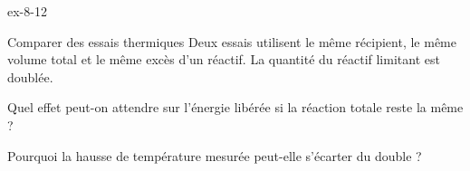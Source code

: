 \begin{blocLivre}{ex-8-12}\begin{exercice}[3]{Comparer des essais thermiques}
Deux essais utilisent le même récipient, le même volume total et le même excès d’un réactif. La quantité du réactif limitant est doublée.
\begin{questions}
\item Quel effet peut-on attendre sur l’énergie libérée si la réaction totale reste la même ?
\item Pourquoi la hausse de température mesurée peut-elle s’écarter du double ?
\end{questions}
\end{exercice}\end{blocLivre}

